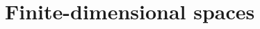 \documentclass[article, a4paper, 11pt, oneside]{memoir}
\numberwithin{equation}{chapter}
\begin{document}
\section{Finite-dimensional spaces}




    
\end{document}

